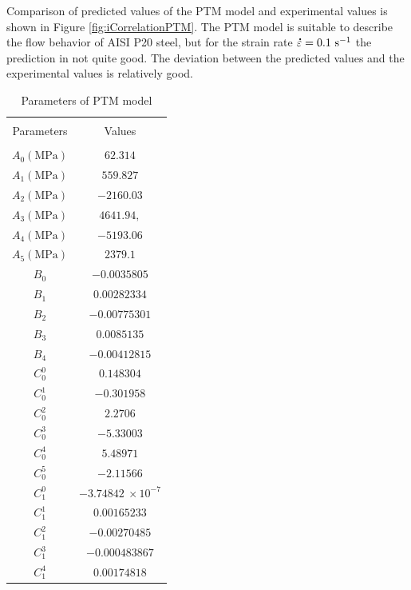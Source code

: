\documentclass[twoside,english,1p,final,sort&compress]{elsarticle}
\theoremstyle{plain}
\newcommand{\mdot}[1]{\accentset{\mbox{\bfseries .}}{#1}}
\newcommand{\ps}{\text{s}^{-1}}
\begin{document}
Comparison of predicted values of the PTM model and experimental values is shown in Figure \ref{fig:iCorrelationPTM}. The PTM model is suitable to describe the ﬂow behavior of AISI P20 steel, but for the strain rate $\mdot\varepsilon = 0.1\ \ps$ the prediction in not quite good. The deviation between the predicted values and the experimental values is relatively good.
\begin{table}[!h]
\centering{}
\caption{Parameters of PTM model\label{tab:PTM-parameters}}
\begin{tabular}{cc}
\hline
&   \\
Parameters &Values\\
&   \\
\hline
$A_0 (\text{MPa})$ & $62.314$ \\
$A_1 (\text{MPa})$ & $559.827$ \\
$A_2 (\text{MPa})$ & $-2160.03$ \\
$A_3 (\text{MPa})$ & $4641.94,$ \\
$A_4 (\text{MPa})$ & $-5193.06$ \\
$A_5 (\text{MPa})$ & $2379.1$ \\
$B_0 $   & $-0.0035805$\\
$B_1 $   & $0.00282334$ \\
$B_2 $   & $-0.00775301$\\
$B_3 $   & $0.0085135$ \\
$B_4 $   & $-0.00412815$\\
$C_0^0 $ & $0.148304$ \\
$C_0^1 $ & $-0.301958$ \\
$C_0^2 $ & $2.2706$ \\
$C_0^3 $ & $-5.33003$ \\
$C_0^4 $ & $5.48971$ \\
$C_0^5 $ & $-2.11566$\\
$C_1^0 $ & $-3.74842\ \times10^{-7}$\\
$C_1^1 $ & $0.00165233$\\
$C_1^2 $ & $-0.00270485$ \\
$C_1^3 $ & $-0.000483867$\\
$C_1^4 $ & $0.00174818$ \\
\hline
\end{tabular}
\end{table}
\end{document}
